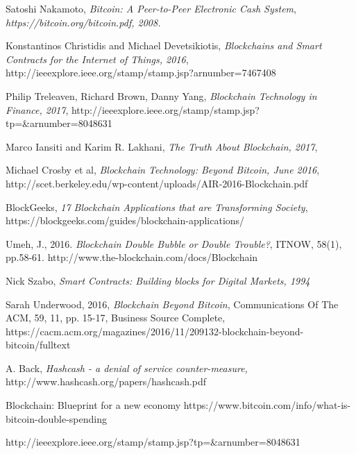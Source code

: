 \documentclass[report]{IEEEtran}
\begin{document}
\begin{thebibliography}{1}

Satoshi Nakamoto, \emph{Bitcoin: A Peer-to-Peer Electronic Cash System}, \em{https://bitcoin.org/bitcoin.pdf, 2008.}

Konstantinos Christidis and Michael Devetsikiotis, \emph{Blockchains and Smart Contracts for the Internet of Things, 2016}, http://ieeexplore.ieee.org/stamp/stamp.jsp?arnumber=7467408

Philip Treleaven, Richard Brown, Danny Yang, \emph{Blockchain Technology in Finance, 2017}, http://ieeexplore.ieee.org/stamp/stamp.jsp?tp=&arnumber=8048631

Marco Iansiti and Karim R. Lakhani, \emph{The Truth About Blockchain, 2017}, %

Michael Crosby et al, \emph{Blockchain Technology: Beyond Bitcoin, June 2016}, http://scet.berkeley.edu/wp-content/uploads/AIR-2016-Blockchain.pdf

BlockGeeks, \emph{17 Blockchain Applications that are Transforming Society}, https://blockgeeks.com/guides/blockchain-applications/

Umeh, J., 2016. \emph{Blockchain Double Bubble or Double Trouble?}, ITNOW, 58(1), pp.58-61.
http://www.the-blockchain.com/docs/Blockchain%

Nick Szabo, \emph{Smart Contracts: Building blocks for Digital Markets, 1994}

Sarah Underwood, 2016, \emph{Blockchain Beyond Bitcoin}, Communications Of The ACM, 59, 11, pp. 15-17, Business Source Complete,
https://cacm.acm.org/magazines/2016/11/209132-blockchain-beyond-bitcoin/fulltext

A. Back, \emph{Hashcash - a denial of service counter-measure,} 
http://www.hashcash.org/papers/hashcash.pdf

Blockchain: Blueprint for a new economy
https://www.bitcoin.com/info/what-is-bitcoin-double-spending

http://ieeexplore.ieee.org/stamp/stamp.jsp?tp=&arnumber=8048631
\end{thebibliography}
\end{document}
